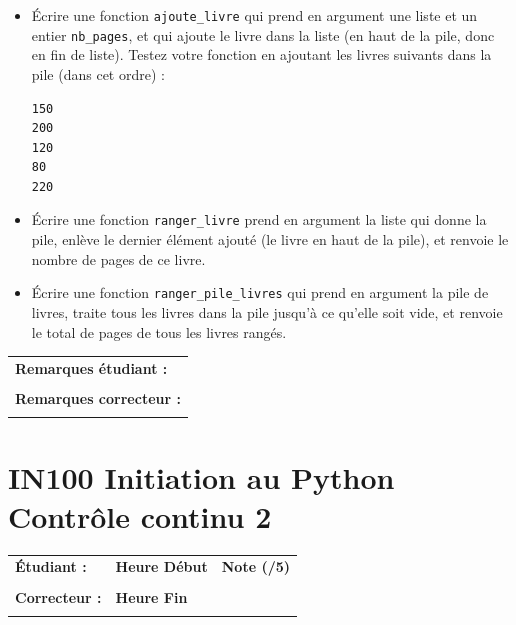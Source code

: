 \documentclass[a4paper,11pt]{article}
\begin{document}
\begin{itemize}
\item[1.] \'Ecrire une fonction \texttt{ajoute\_livre} qui prend en argument une liste et un entier \texttt{nb\_pages}, et qui ajoute le livre dans la liste (en haut de la pile, donc en fin de liste).
Testez votre fonction en ajoutant les livres suivants dans la pile (dans cet ordre) :
\vspace{-0.2 cm}
\begin{verbatim}
150
200
120
80
220
\end{verbatim}
\vspace{-0.2 cm}
\item[2.] \'Ecrire une fonction \texttt{ranger\_livre} prend en argument la liste qui donne la pile, enlève le dernier élément ajouté (le livre en haut de la pile),
et renvoie le nombre de pages de ce livre.
\item[3.] \'Ecrire une fonction \texttt{ranger\_pile\_livres} qui prend en argument  la pile de livres, traite tous les livres dans la pile jusqu’à ce qu’elle soit vide,
et renvoie le total de pages de tous les livres rangés. 
\end{itemize}
\vspace{-0.2 cm}
\begin{table}[h!]
\centering
\renewcommand{\arraystretch}{1.4} %
\begin{tabular}{|p{15cm}|}
\hline
\textbf{Remarques étudiant :}    \\
 \\
\hline
\textbf{Remarques correcteur :}  \\
 \\
\hline
\end{tabular}
\end{table}

\newpage

\vspace{-0.2 cm}

\section*{\center IN100 Initiation au Python\\
Contrôle continu 2}

\vspace{-0.3 cm}

\begin{table}[h!]
\centering
\renewcommand{\arraystretch}{1.4} %
\begin{tabular}{|p{10cm}|p{3cm}|p{2cm}|}
\hline
\textbf{Étudiant :} & \textbf{Heure Début }  & \textbf{Note (/5) }  \\
& & \\
\hline
\textbf{Correcteur :} & \textbf{Heure Fin } & \\
& & \\
\hline

\hline
\end{tabular}
\end{table}
\vspace{-0.4 cm}
\end{document}
